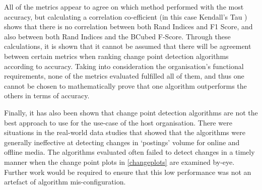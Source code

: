 \documentclass[../main.tex]{subfiles}
\begin{document}
All of the metrics appear to agree on which method performed with the most accuracy, but calculating a correlation co-efficient (in this case Kendall's Tau \cite{KENDALL1938}) shows that there is no correlation between both Rand Indices and F1 Score, and also between both Rand Indices and the BCubed F-Score. Through these calculations, it is shown that it cannot be assumed that there will be agreement between certain metrics when ranking change point detection algorithms according to accuracy. Taking into consideration the organisation's functional requirements, none of the metrics evaluated fulfilled all of them, and thus one cannot be chosen to mathematically prove that one algorithm outperforms the others in terms of accuracy.

Finally, it has also been shown that change point detection algorithms are not the best approach to use for the use-case of the host organisation. There were situations in the real-world data studies that showed that the algorithms were generally ineffective at detecting changes in `postings' volume for online and offline media. The algorithms evaluated often failed to detect changes in a timely manner when the change point plots in \autoref{changeplots} are examined by-eye. Further work would be required to ensure that this low performance was not an artefact of algorithm mis-configuration.
\end{document}
